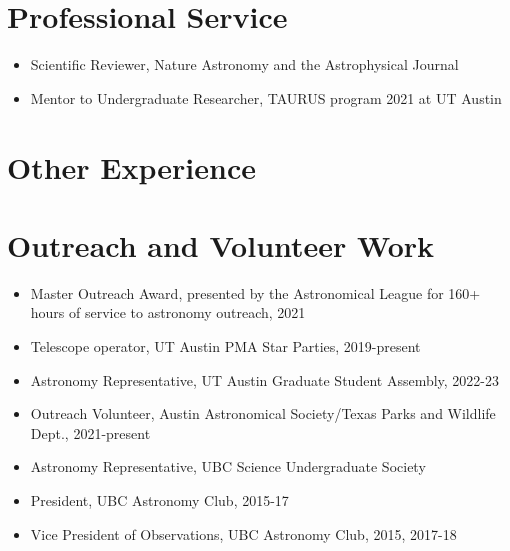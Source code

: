 \documentclass[12pt,a4paper,sans,xetex]{moderncv}        %
\begin{document}
\section{Professional Service}

\begin{itemize}
    \item Scientific Reviewer, Nature Astronomy and the Astrophysical Journal
    \item Mentor to Undergraduate Researcher, TAURUS program 2021 at UT Austin
\end{itemize}

\section{Other Experience}






\section{Outreach and Volunteer Work}

\begin{itemize}
    \item Master Outreach Award, presented by the Astronomical League for 160+ hours of service to astronomy outreach, 2021
    \item Telescope operator, UT Austin PMA Star Parties, 2019-present
    \item Astronomy Representative, UT Austin Graduate Student Assembly, 2022-23
    \item Outreach Volunteer, Austin Astronomical Society/Texas Parks and Wildlife Dept., 2021-present
    \item Astronomy Representative, UBC Science Undergraduate Society
    \item President, UBC Astronomy Club, 2015-17
    \item Vice President of Observations, UBC Astronomy Club, 2015, 2017-18
\end{itemize}
\end{document}

